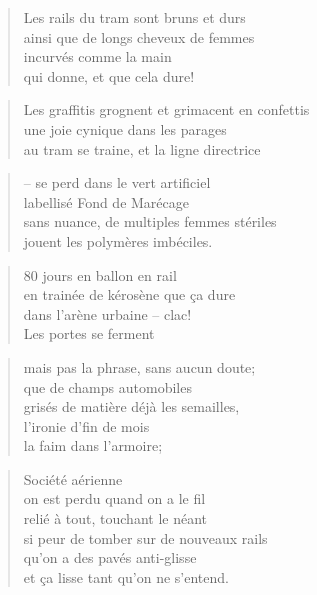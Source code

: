   \begin{verse}
    Les rails du tram sont bruns et durs\\
    ainsi que de longs cheveux de femmes\\
    incurvés comme la main\\
    qui donne, et que cela dure!
  \end{verse}
  \begin{verse}
    Les graffitis grognent et grimacent en confettis\\
    une joie cynique dans les parages\\
    au tram se traine, et la ligne directrice
  \end{verse}
  \begin{verse}
    -- se perd
    dans le vert artificiel\\
    labellisé Fond de Marécage\\
    sans nuance, de multiples femmes stériles\\
    jouent les polymères imbéciles.
  \end{verse}
  \begin{verse}
    80 jours en ballon en rail\\
    en trainée de kérosène que ça dure\\
    dans l’arène urbaine -- clac!\\
    Les portes se ferment
  \end{verse}
  \begin{verse}
    mais pas la phrase, sans aucun doute;\\
    que de champs automobiles\\
    grisés de matière déjà les semailles,\\
    l’ironie d’fin de mois\\
    la faim dans l’armoire;
  \end{verse}
  \begin{verse}
    Société aérienne\\
    on est perdu quand on a le fil\\
    relié à tout, touchant le néant\\
    si peur de tomber sur de nouveaux rails\\
    qu’on a des pavés anti-glisse\\
    et ça lisse tant qu’on ne s’entend.
  \end{verse}
